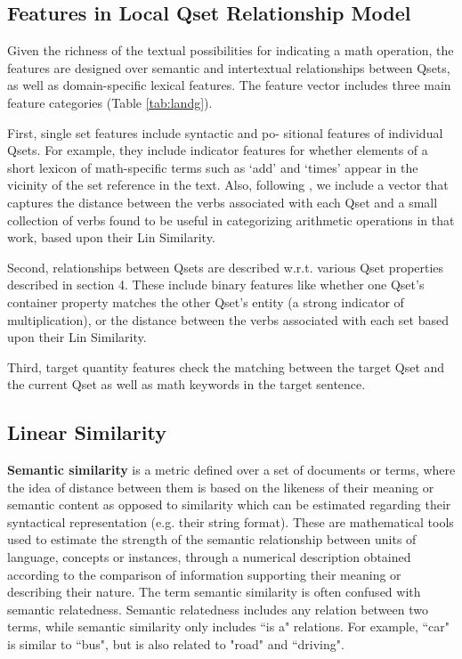 \documentclass[document.tex]{subfiles}
\begin{document}
\subsection{Features in Local Qset Relationship Model}
Given the richness of the textual possibilities for indicating a math operation, the features are designed over semantic and intertextual relationships between Qsets, as well as domain-specific lexical features. The feature vector includes three main feature categories (Table \ref{tab:landg}).

First, single set features include syntactic and po-
sitional features of individual Qsets. For example,
they include indicator features for whether elements
of a short lexicon of math-specific terms such as ‘add’ and ‘times’ appear in the vicinity of the set
reference in the text. Also, following \cite{1}, we include a vector that captures the distance between the verbs associated with each Qset and a small collection of verbs found to be useful
in categorizing arithmetic operations in that work,
based upon their Lin Similarity\cite{31}.

Second, relationships between Qsets are described w.r.t. various Qset properties described in section 4. These include binary features like whether one Qset’s container property matches the other Qset’s entity (a strong indicator of multiplication), or
the distance between the verbs associated with each
set based upon their Lin Similarity.

Third, target quantity features check the matching
between the target Qset and the current Qset as well
as math keywords in the target sentence.
\subsection{Linear Similarity}

\noindent \textbf{Semantic similarity} is a metric defined over a set of documents or terms, where the idea of distance between them is based on the likeness of their meaning or semantic content as opposed to similarity which can be estimated regarding their syntactical representation (e.g. their string format). These are mathematical tools used to estimate the strength of the semantic relationship between units of language, concepts or instances, through a numerical description obtained according to the comparison of information supporting their meaning or describing their nature. The term semantic similarity is often confused with semantic relatedness. Semantic relatedness includes any relation between two terms, while semantic similarity only includes ``is a" relations. For example, ``car" is similar to ``bus", but is also related to "road" and ``driving".
\end{document}
